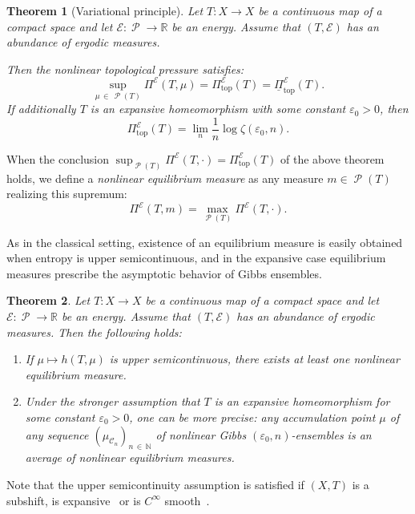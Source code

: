 \documentclass[AHL, Unicode, longabstracts,published]{cedram}
\theoremstyle{plain}
\newtheorem{theol}{Theorem}
\theoremstyle{plain}
\newcommand\eps{\varepsilon}
\newcommand\NLP{\Pi}
\renewcommand\top{{\mathrm{top}}}
\newcommand\Prob{{\operatorname{\mathscr{P}}}}
\newcommand*\8{\infty}
\newcommand\NN{\mathbb{N}}
\newcommand\RR{\mathbb{R}}
\newcommand{\En}{\mathcal{E}}
\newcommand{\cC}{\mathcal C}
\newcommand*{\romanenumi}{\renewcommand*{\theenumi}{\roman{enumi}}}
\begin{document}
\begin{theol}[Variational principle]\label{thm-var-prin-NL}
Let $T:X\to X$ be a continuous map of a compact space and let $\En:\Prob\to\RR$ be an energy. Assume that $(T,\En)$ has an abundance of ergodic measures.


Then the nonlinear topological pressure satisfies:
\begin{equation}\label{eq-def-Ptop}
\sup_{\mu\,\in\,\Prob(T)} \NLP^\En(T,\mu) = \NLP^\En_\top(T) = \underline{\NLP}_\top^\En(T).
\end{equation}
If additionally $T$ is an expansive homeomorphism with some constant $\eps_0>0$, then
\begin{equation}\label{eq-ent-eps}
\NLP^\En_\top(T) =\lim_n \frac1n \log \zeta(\eps_0,n).
\end{equation}
\end{theol}


When the conclusion $\sup_{\Prob(T)} \NLP^\En(T,\cdot) = \NLP^\En_\top(T)$ of the above theorem holds, we define a \emph{nonlinear equilibrium measure} as any measure $m\in\Prob(T)$ realizing this supremum:
\[
\NLP^\En(T,m)=\max_{\Prob(T)} \NLP^\En(T,\cdot).
\]


As in the classical setting, existence of an equilibrium measure is easily obtained when entropy is upper semicontinuous, and in the expansive case equilibrium measures prescribe the asymptotic behavior of Gibbs ensembles.

\begin{theol}\label{thm-existence-NL}
Let $T:X\to X$ be a continuous map of a compact space and let $\En:\Prob\to\RR$ be an energy. Assume that $(T,\En)$ has an abundance of ergodic measures. Then the following holds:
\begin{enumerate}\romanenumi
\item \label{enumi-B1}
If $\mu\mapsto h(T,\mu)$ is upper semicontinuous, there exists at least one nonlinear equilibrium measure.
\item \label{enumi-B2}
Under the stronger assumption that $T$ is an expansive homeomorphism for some constant $\eps_0>0$, one can be more precise: any accumulation point $\mu$ of any sequence $(\mu_{\cC_n})_{n\,\in\,\NN}$ of nonlinear Gibbs $(\eps_0,n)$-ensembles is an average of nonlinear equilibrium measures.
\end{enumerate}
\end{theol}

Note that the upper semicontinuity assumption is satisfied if $(X,T)$ is a subshift, is expansive~\cite{Walters-book} or is $C^\infty$ smooth~\cite{Buzzi-SIM}.
\end{document}
